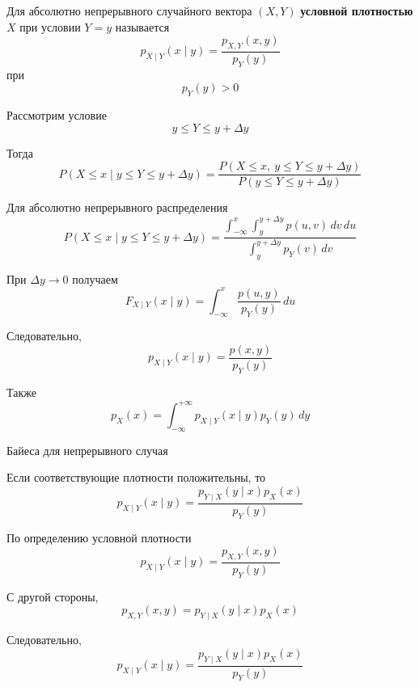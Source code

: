 \documentclass[12pt,a4paper]{article}
\begin{document}
\begin{definition}

Для абсолютно непрерывного случайного вектора $(X,Y)$ \textbf{условной плотностью} $X$ при условии $Y=y$ называется
\[
p_{X\mid Y}(x\mid y)
=
\frac{p_{X,Y}(x,y)}{p_Y(y)}
\]
при
\[
p_Y(y)>0
\]

\end{definition}

Рассмотрим условие
\[
y\leq Y\leq y+\Delta y
\]

Тогда
\[
P(X\leq x\mid y\leq Y\leq y+\Delta y)
=
\frac{
P(X\leq x,\ y\leq Y\leq y+\Delta y)
}{
P(y\leq Y\leq y+\Delta y)
}
\]

Для абсолютно непрерывного распределения
\[
P(X\leq x\mid y\leq Y\leq y+\Delta y)
=
\frac{
\displaystyle
\int_{-\infty}^x
\int_y^{y+\Delta y}
p(u,v)\,dv\,du
}{
\displaystyle
\int_y^{y+\Delta y}p_Y(v)\,dv
}
\]

При $\Delta y\to0$ получаем
\[
F_{X\mid Y}(x\mid y)
=
\int_{-\infty}^x
\frac{p(u,y)}{p_Y(y)}\,du
\]

Следовательно,
\[
p_{X\mid Y}(x\mid y)
=
\frac{p(x,y)}{p_Y(y)}
\]

Также
\[
p_X(x)
=
\int_{-\infty}^{+\infty}
p_{X\mid Y}(x\mid y)p_Y(y)\,dy
\]

\begin{theorem}{Байеса для непрерывного случая}

Если соответствующие плотности положительны, то
\[
p_{X\mid Y}(x\mid y)
=
\frac{
p_{Y\mid X}(y\mid x)p_X(x)
}{
p_Y(y)
}
\]

\end{theorem}

\begin{proofbox}{}

По определению условной плотности
\[
p_{X\mid Y}(x\mid y)
=
\frac{p_{X,Y}(x,y)}{p_Y(y)}
\]

С другой стороны,
\[
p_{X,Y}(x,y)
=
p_{Y\mid X}(y\mid x)p_X(x)
\]

Следовательно,
\[
p_{X\mid Y}(x\mid y)
=
\frac{
p_{Y\mid X}(y\mid x)p_X(x)
}{
p_Y(y)
}
\]

\end{proofbox}
\end{document}
